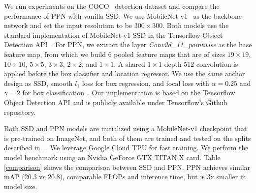 \documentclass[10pt,twocolumn,letterpaper]{article}
\begin{document}
We run experiments on the COCO~\cite{lin2014coco} detection dataset
and compare the performance of PPN with vanilla SSD.
We use MobileNet v1~\cite{howard2017mobilenet} as the backbone network
and set the input resolution to be $300\times 300$.
Both models use the standard implementation of MobileNet-v1 SSD in
the Tensorflow Object Detection API~\cite{huang2017gmi}.
For PPN,
we extract the layer \textit{Conv2d\_11\_pointwise} as the base feature map,
from which we build 6 pooled feature maps that are of sizes
$19\times 19$,
$10\times 10$,
$5\times 5$,
$3\times 3$,
$2\times 2$, and
$1\times 1$.
A shared $1\times 1$ depth 512 convolution is applied before the box classifier and location regressor.
We use the same anchor design as SSD,
smooth $l_{1}$ loss for box regression,
and focal loss with $\alpha=0.25$ and $\gamma=2$ for box classification~\cite{lin2017focal}.
Our implementation is based on the Tensorflow Object Detection API
and is publicly available under Tensorflow's Github repository.

Both SSD and PPN models are initialized using a MobileNet-v1 checkpoint
that is pre-trained on ImageNet, and
both of them are trained and tested on the splits described in
~\cite{huang2017gmi}.
We leverage Google Cloud TPU for fast training.
We perform the model benchmark using an Nvidia GeForce GTX TITAN X card.
Table \ref{comparison} shows the comparison between SSD and PPN.
PPN achieves similar mAP (20.3 vs 20.8),
comparable FLOPs and inference time,
but is 3x smaller in model size.


{\small


}
\end{document}
